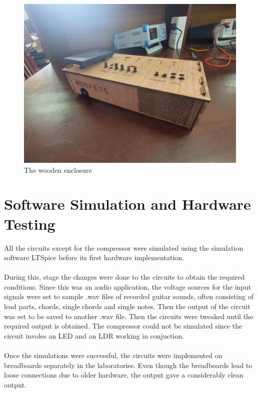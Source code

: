 \documentclass{article}
\begin{document}
            \begin{figure}[h!]
                    \centering
                    \includegraphics[scale=0.2]{1.jpg}
                    \caption{The wooden enclosure}
                    \label{fig:enter-label}
                \end{figure}

	\section{Software Simulation and Hardware Testing}
            All the circuits except for the compressor were simulated using the simulation software LTSpice before its first hardware implementation.\\\\
            
            During this, stage the changes were done to the circuits to obtain the required conditions. Since this was an audio application, the voltage sources for the input signals were set to sample .wav files of recorded guitar sounds, often consisting of lead parts, chords, single chords and single notes. Then the output of the circuit was set to be saved to another .wav file. Then the circuits were tweaked until the required output is obtained.
            The compressor could not be simulated since the circuit involes an LED and an LDR working in conjuction.\\\\

            Once the simulations were successful, the circuits were implemented on breadboards separately in the laboratories. Even though the breadboards lead to loose connections due to older hardware, the output gave a considerably clean output.
\end{document}
